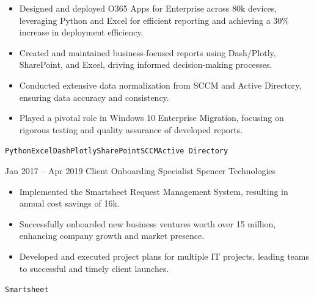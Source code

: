 \documentclass[9pt]{developercv} %
\begin{document}
\begin{entrylist}
{\begin{itemize}
            \item Designed and deployed O365 Apps for Enterprise across 80k devices, leveraging Python and Excel for efficient reporting and achieving a 30\% increase in deployment efficiency.
            \item Created and maintained business-focused reports using Dash/Plotly, SharePoint, and Excel, driving informed decision-making processes.
            \item Conducted extensive data normalization from SCCM and Active Directory, ensuring data accuracy and consistency.
            \item Played a pivotal role in Windows 10 Enterprise Migration, focusing on rigorous testing and quality assurance of developed reports.
        \end{itemize}
        \texttt{Python}\slashsep\texttt{Excel}\slashsep\texttt{Dash}\slashsep\texttt{Plotly}\slashsep\texttt{SharePoint}\slashsep\texttt{SCCM}\slashsep\texttt{Active Directory}
        }
    \entry
        {Jan 2017 -- Apr 2019}
        { Client Onboarding Specialist}
        {Spencer Technologies}
        {
        \begin{itemize}
            \item Implemented the Smartsheet Request Management System, resulting in annual cost savings of 16k.
            \item Successfully onboarded new business ventures worth over 15 million, enhancing company growth and market presence.
            \item Developed and executed project plans for multiple IT projects, leading teams to successful and timely client launches.
        \end{itemize}
        \texttt{Smartsheet}
        }
\end{entrylist}

\end{document}
